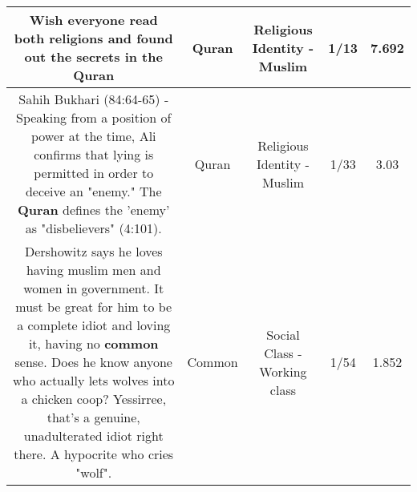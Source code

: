 \documentclass[11pt]{article}
\newlength\mylength
\begin{document}
\begin{center}
\begin{longtable}{|C{.65\mylength}|C{.30\mylength}|C{.12\mylength}|C{.12\mylength}|C{.12\mylength}|}
  \small Wish everyone read both religions and found out the secrets in the Quran\normalsize   & Quran & Religious Identity - Muslim & 1/13 & 7.692 \\  \hline
  \small Sahih Bukhari (84:64-65) - Speaking from a position of power at the time, Ali confirms that lying is permitted in order to deceive an "enemy."  The \textbf{Quran} defines the 'enemy' as "disbelievers" (4:101).\normalsize   & Quran & Religious Identity - Muslim & 1/33 & 3.03 \\  \hline
  \small Dershowitz says he loves having muslim men and women in government. It must be great for him to be a complete idiot and loving it, having no \textbf{common} sense. Does he know anyone who actually lets wolves into a chicken coop? Yessirree, that's a genuine, unadulterated idiot right there. A hypocrite who cries "wolf".\normalsize   & Common & Social Class - Working class & 1/54 & 1.852 \\  \hline

\end{longtable}
\end{center}
\end{document}
